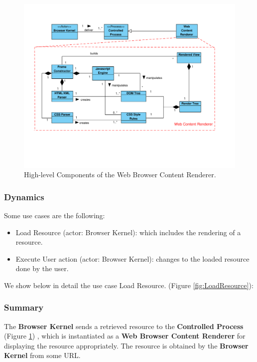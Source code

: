 \documentclass[]{acmlarge}
\begin{document}
    \begin{figure}[h!t]
      \centering
      \includegraphics[scale=0.64]{figures/WebContentRenderer-v4.pdf}
      \vspace*{-3cm}
      \caption{High-level Components of the Web Browser Content Renderer.}
      \label{fig:WCR}
    \end{figure}

    \subsubsection*{Dynamics}
    Some use cases are the following:
    \begin{itemize}\leftskip2.5em
      \item Load Resource (actor: Browser Kernel): which includes the rendering of a resource.

      \item Execute User action (actor: Browser Kernel): changes to the loaded resource done by the user.

    \end{itemize}
    We show below in detail the use case Load Resource. (Figure \ref{fig:LoadResource}):
    \subsubsection*{Summary} The \textbf{Browser Kernel} sends a retrieved resource to the \textbf{Controlled Process} (Figure \ref{fig:WCR})
    , which is instantiated as a \textbf{Web Browser Content Renderer} for displaying the resource appropriately. The resource is obtained by the \textbf{Browser Kernel} from some URL.
\end{document}
